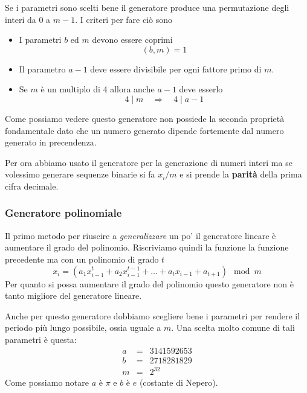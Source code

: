Se i parametri sono scelti bene il generatore produce una permutazione degli interi da 0 a $m - 1$. I criteri per fare
ci\`o sono
\begin{itemize}
	\item I parametri $b$ ed $m$ devono essere coprimi
	      \[ (b, m) = 1 \]
	\item Il parametro $a - 1$ deve essere divisibile per ogni fattore primo di $m$.
	\item Se $m$ \`e un multiplo di 4 allora anche $a-1$ deve esserlo
	      \[ 4 \mid m \quad \Rightarrow \quad 4 \mid a - 1 \]
\end{itemize}
Come possiamo vedere questo generatore non possiede la seconda propriet\`a fondamentale dato che un numero generato
dipende fortemente dal numero generato in precendenza.

Per ora abbiamo usato il generatore per la generazione di numeri interi ma se volessimo generare sequenze binarie
si fa $x_i / m$ e si prende la \textbf{parit\`a} della prima cifra decimale.

\subsubsection{Generatore polinomiale}
Il primo metodo per riuscire a \emph{generalizzare} un po' il generatore lineare \`e aumentare il grado del polinomio.
Riscriviamo quindi la funzione la funzione precedente ma con un polinomio di grado $t$
\[ x_i = (a_1 x_{i-1}^t + a_2 x_{i-1}^{t-1} + \dots + a_t x_{i-1} + a_{t+1}) \mod{m} \]
Per quanto si possa aumentare il grado del polinomio questo generatore non \`e tanto migliore del generatore lineare.

Anche per questo generatore dobbiamo scegliere bene i parametri per rendere il periodo pi\`u lungo possibile, ossia
uguale a $m$. Una scelta molto comune di tali parametri \`e questa:
\[
	\begin{matrix}
		a & = & 3141592653 \\
		b & = & 2718281829 \\
		m & = & 2^{32}
	\end{matrix}
\]
Come possiamo notare $a$ \`e $\pi$ e $b$ \`e $e$ (costante di Nepero).

